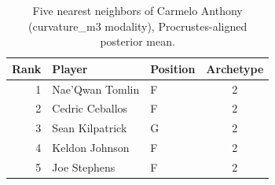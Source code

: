 \begin{table}[htbp]
  \centering\small
  \begin{tabular}{rllc}
    \toprule
    Rank & Player & Position & Archetype \\
    \midrule
    1 & Nae'Qwan Tomlin & F & 2 \\
    2 & Cedric Ceballos & F & 2 \\
    3 & Sean Kilpatrick & G & 2 \\
    4 & Keldon Johnson & F & 2 \\
    5 & Joe Stephens & F & 2 \\
    \bottomrule
  \end{tabular}
  \caption{Five nearest neighbors of Carmelo Anthony (curvature_m3 modality), Procrustes-aligned posterior mean.}
  \label{tab:Carmelo_Anthony_neighbors_curvature_m3}
\end{table}

